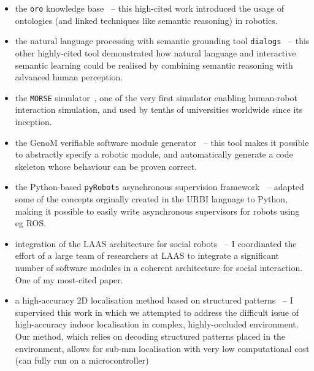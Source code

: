 \begin{itemize}
    \item the \texttt{oro} knowledge base~\autocite{lemaignan2010oro} --
        this high-cited work introduced the usage of ontologies (and linked techniques like semantic
        reasoning) in robotics.

    \item the natural language processing with semantic grounding tool
        \texttt{dialogs}~\autocite{lemaignan2011grounding} -- this other
        highly-cited tool demonstrated how natural language and interactive
        semantic learning could be realised by combining semantic reasoning with
        advanced human perception.

    \item the \texttt{MORSE} simulator~\autocite{echeverria2011morse,
        lemaignan2012morse}, one of the very first simulator enabling
        human-robot interaction simulation, and used by tenths of universities
        worldwide since its inception.

    \item the GenoM verifiable software module
        generator~\autocite{mallet2010genom3} -- this tool makes it possible to
        abstractly specify a robotic module, and automatically generate a code
        skeleton whose behaviour can be proven correct.

    \item the Python-based \texttt{pyRobots} asynchronous supervision
        framework~\autocite{lemaignan2015pyrobots} -- adapted some of the concepts
        orginally created in the URBI language to Python, making it possible to
        easily write asynchronous supervisors for robots using eg ROS.

    \item integration of the LAAS architecture for social
        robots~\autocite{lemaignan2017artificial} -- I coordinated the effort of
        a large team of researchers at LAAS to integrate a significant number of
        software modules in a coherent architecture for social interaction. One
        of my most-cited paper.

    \item a high-accuracy 2D localisation method based on structured
        patterns~\autocite{hostettler2016realtime} -- I supervised this work
        in which we attempted to address the difficult issue of high-accuracy
        indoor localisation in complex, highly-occluded environment. Our method,
        which relies on decoding structured patterns placed in the environment,
        allows for sub-mm localisation with very low computational cost (can
        fully run on a microcontroller)


\end{itemize}
